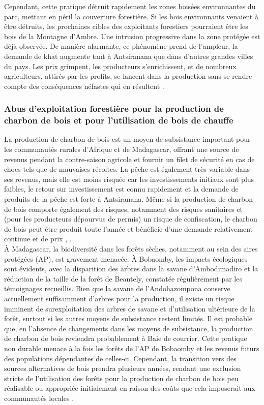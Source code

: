 Cependant, cette pratique détruit rapidement les zones boisées environnantes du parc, mettant en péril la couverture forestière. Si les bois environnants venaient à être détruits, les prochaines cibles des exploitants forestiers pourraient être les bois de la Montagne d'Ambre. Une intrusion progressive dans la zone protégée est déjà observée. De manière alarmante, ce phénomène prend de l'ampleur, la demande de khat augmente tant à Antsiranana que dans d'autres grandes villes du pays. Les prix grimpent, les producteurs s'enrichissent, et de nombreux agriculteurs, attirés par les profits, se lancent dans la production sans se rendre compte des conséquences néfastes qui en résultent \cite{3}.
\\

\subsubsection{Abus d’exploitation forestière pour la production de charbon de bois et pour l’utilisation de bois de chauffe}
La production de charbon de bois est un moyen de subsistance important pour les communautés rurales d'Afrique et de Madagascar, offrant une source de revenus pendant la contre-saison agricole et fournir un filet de sécurité en cas de chocs tels que de mauvaises récoltes. La pêche est également très variable dans ses revenus, mais elle est moins risquée car les investissements initiaux sont plus faibles, le retour sur investissement est connu rapidement et la demande de produits de la pêche est forte à Antsiranana. Même si la production de charbon de bois comporte également des risques, notamment des risques sanitaires et (pour les producteurs dépourvus de permis) un risque de confiscation, le charbon de bois peut être produit toute l’année et bénéficie d’une demande relativement continue et de prix \cite{4}, \cite{5}.
\\

À Madagascar, la biodiversité dans les forêts sèches, notamment au sein des aires protégées (AP), est gravement menacée. À Bobaomby, les impacts écologiques sont évidents, avec la disparition des arbres dans la savane d'Ambodimadiro et la réduction de la taille de la forêt de Beantely, constatée régulièrement par les témoignages recueillis. Bien que la savane de l'Andohazompona conserve actuellement suffisamment d'arbres pour la production, il existe un risque imminent de surexploitation des arbres de savane et d'utilisation ultérieure de la forêt, surtout si les autres moyens de subsistance restent limités. Il est probable que, en l'absence de changements dans les moyens de subsistance, la production de charbon de bois reviendra probablement à Baie de courrier. Cette pratique non durable menace à la fois les forêts de l'AP de Bobaomby et les revenus futurs des populations dépendantes de celles-ci. Cependant, la transition vers des sources alternatives de bois prendra plusieurs années, rendant une exclusion stricte de l'utilisation des forêts pour la production de charbon de bois peu réalisable ou appropriée initialement en raison des coûts que cela imposerait aux communautés locales \cite{4}.
\\

